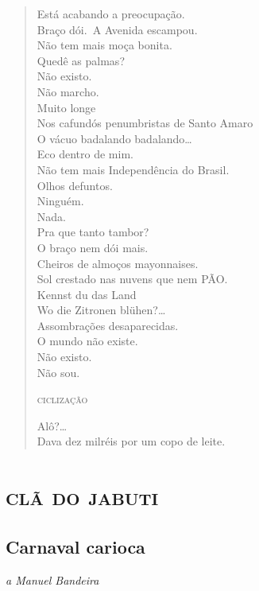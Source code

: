 \begin{verse}
Está acabando a preocupação.\\
Braço dói.\
A Avenida escampou.\\
Não tem mais moça bonita.\\
Quedê as palmas?\\
Não existo.\\
Não marcho.\\
Muito longe\\
Nos cafundós penumbristas de Santo Amaro\\
O vácuo badalando badalando\ldots{}\\
Eco dentro de mim.\\
Não tem mais Independência do Brasil.\\
Olhos defuntos.\\
Ninguém.\\
Nada.\\
Pra que tanto tambor?\\
O braço nem dói mais.\\
Cheiros de almoços mayonnaises.\\
Sol crestado nas nuvens que nem PÃO.\\
\qquad\qquad Kennst du das Land\\
\qquad\qquad Wo die Zitronen blühen?\ldots{}\\
\qquad\qquad\qquad\qquad  Assombrações desaparecidas.\\
\qquad\qquad\qquad\qquad\qquad  O mundo não existe.\\
\qquad\qquad\qquad\qquad\qquad\qquad Não existo.\\
\qquad\qquad\qquad\qquad\qquad\qquad Não sou.

\qquad\qquad\qquad\quad\textsc{ciclização}

\qquad\qquad\qquad\qquad\qquad Alô?\ldots{}\\
Dava dez milréis por um copo de leite.
\end{verse}

\part{\textsc{clã do jabuti}}

\chapter[Carnaval carioca]{Carnaval carioca }

\hfill\emph{a Manuel Bandeira}

